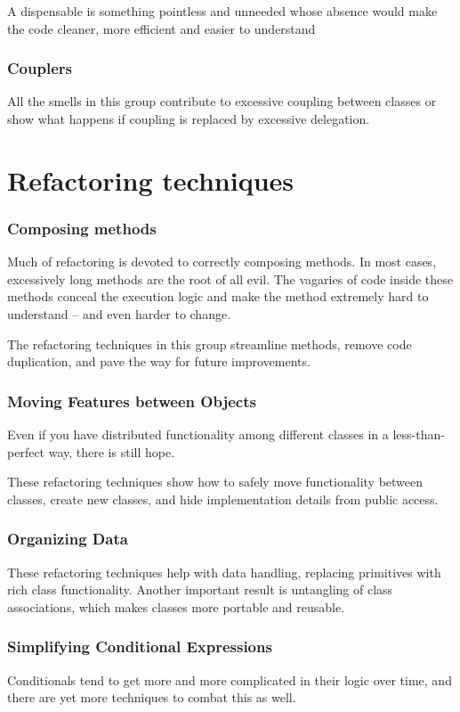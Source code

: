 \documentclass{book}
\begin{document}
A dispensable is something pointless and unneeded whose absence would make the code cleaner, more efficient and easier to understand
\subsection{Couplers}

All the smells in this group contribute to excessive coupling between classes or show what happens if coupling is replaced by excessive delegation.
\chapter{Refactoring techniques}
\subsection{Composing methods}

Much of refactoring is devoted to correctly composing methods. In most cases, excessively long methods are the root of all evil.
The vagaries of code inside these methods conceal the execution logic and make the method extremely hard to understand – and even harder to change.

The refactoring techniques in this group streamline methods, remove code duplication, and pave the way for future improvements.
\subsection{Moving Features between Objects}
Even if you have distributed functionality among different classes in a less-than-perfect way, there is still hope.

These refactoring techniques show how to safely move functionality between classes, create new classes, and hide implementation details from public access.
\subsection{Organizing Data}
These refactoring techniques help with data handling, replacing primitives with rich class functionality.
Another important result is untangling of class associations, which makes classes more portable and reusable.
\subsection{Simplifying Conditional Expressions}
Conditionals tend to get more and more complicated in their logic over time, and there are yet more techniques to combat this as well.
\end{document}
